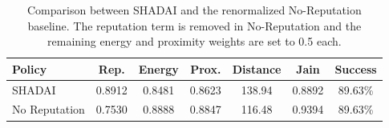 \begin{table}[t]
\centering
\caption{Comparison between SHADAI and the renormalized No-Reputation baseline. The reputation term is removed in No-Reputation and the remaining energy and proximity weights are set to 0.5 each.}
\label{tab:c23_norep}
\begin{tabular}{lcccccc}
\hline
Policy & Rep. & Energy & Prox. & Distance & Jain & Success \\
\hline
SHADAI & 0.8912 & 0.8481 & 0.8623 & 138.94 & 0.8892 & 89.63\% \\
No Reputation & 0.7530 & 0.8888 & 0.8847 & 116.48 & 0.9394 & 89.63\% \\
\hline
\end{tabular}
\end{table}